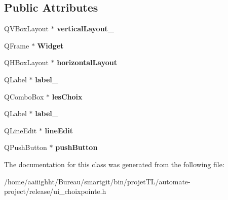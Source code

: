 \subsection*{Public Attributes}
\begin{DoxyCompactItemize}
\item 
\hypertarget{class_ui__choix_pointe_a7afdfea5e8c527bd48b8dcf812e9313b}{Q\-V\-Box\-Layout $\ast$ {\bfseries vertical\-Layout\-\_}}\label{class_ui__choix_pointe_a7afdfea5e8c527bd48b8dcf812e9313b}

\item 
\hypertarget{class_ui__choix_pointe_a2a1342e3137752c3a24a8a8c81b87331}{Q\-Frame $\ast$ {\bfseries Widget}}\label{class_ui__choix_pointe_a2a1342e3137752c3a24a8a8c81b87331}

\item 
\hypertarget{class_ui__choix_pointe_aeabb6c9ebcf9467663fdc530c0bb4237}{Q\-H\-Box\-Layout $\ast$ {\bfseries horizontal\-Layout}}\label{class_ui__choix_pointe_aeabb6c9ebcf9467663fdc530c0bb4237}

\item 
\hypertarget{class_ui__choix_pointe_a1930f2367ebc807106aa83407ac8362f}{Q\-Label $\ast$ {\bfseries label\-\_}}\label{class_ui__choix_pointe_a1930f2367ebc807106aa83407ac8362f}

\item 
\hypertarget{class_ui__choix_pointe_afe24a2593c7263dd1f914bcd64b54c41}{Q\-Combo\-Box $\ast$ {\bfseries les\-Choix}}\label{class_ui__choix_pointe_afe24a2593c7263dd1f914bcd64b54c41}

\item 
\hypertarget{class_ui__choix_pointe_aa0913ec085e3bcd801ce0e1d0a3cc9c9}{Q\-Label $\ast$ {\bfseries label\-\_}}\label{class_ui__choix_pointe_aa0913ec085e3bcd801ce0e1d0a3cc9c9}

\item 
\hypertarget{class_ui__choix_pointe_a8b9faf280027191a0d777b165edcbf1c}{Q\-Line\-Edit $\ast$ {\bfseries line\-Edit}}\label{class_ui__choix_pointe_a8b9faf280027191a0d777b165edcbf1c}

\item 
\hypertarget{class_ui__choix_pointe_a07dc96c47c44081ff741dfdb827607e5}{Q\-Push\-Button $\ast$ {\bfseries push\-Button}}\label{class_ui__choix_pointe_a07dc96c47c44081ff741dfdb827607e5}

\end{DoxyCompactItemize}


The documentation for this class was generated from the following file\-:\begin{DoxyCompactItemize}
\item 
/home/aaiiighht/\-Bureau/smartgit/bin/projet\-T\-L/automate-\/project/release/ui\-\_\-choixpointe.\-h\end{DoxyCompactItemize}

